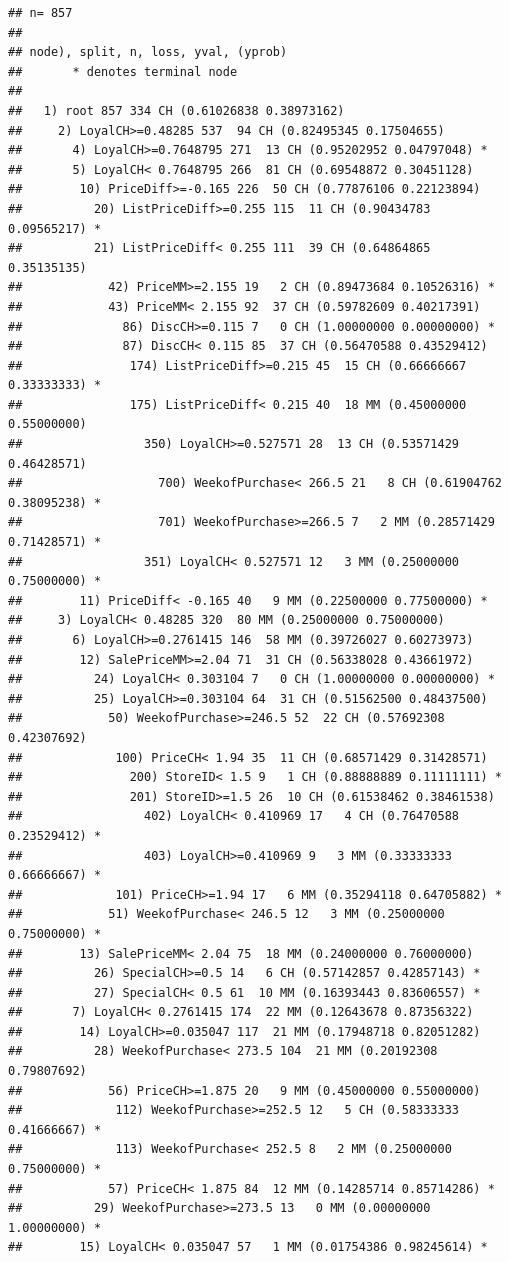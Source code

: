 \documentclass[
]{book}
\begin{document}
\begin{verbatim}
## n= 857 
## 
## node), split, n, loss, yval, (yprob)
##       * denotes terminal node
## 
##   1) root 857 334 CH (0.61026838 0.38973162)  
##     2) LoyalCH>=0.48285 537  94 CH (0.82495345 0.17504655)  
##       4) LoyalCH>=0.7648795 271  13 CH (0.95202952 0.04797048) *
##       5) LoyalCH< 0.7648795 266  81 CH (0.69548872 0.30451128)  
##        10) PriceDiff>=-0.165 226  50 CH (0.77876106 0.22123894)  
##          20) ListPriceDiff>=0.255 115  11 CH (0.90434783 0.09565217) *
##          21) ListPriceDiff< 0.255 111  39 CH (0.64864865 0.35135135)  
##            42) PriceMM>=2.155 19   2 CH (0.89473684 0.10526316) *
##            43) PriceMM< 2.155 92  37 CH (0.59782609 0.40217391)  
##              86) DiscCH>=0.115 7   0 CH (1.00000000 0.00000000) *
##              87) DiscCH< 0.115 85  37 CH (0.56470588 0.43529412)  
##               174) ListPriceDiff>=0.215 45  15 CH (0.66666667 0.33333333) *
##               175) ListPriceDiff< 0.215 40  18 MM (0.45000000 0.55000000)  
##                 350) LoyalCH>=0.527571 28  13 CH (0.53571429 0.46428571)  
##                   700) WeekofPurchase< 266.5 21   8 CH (0.61904762 0.38095238) *
##                   701) WeekofPurchase>=266.5 7   2 MM (0.28571429 0.71428571) *
##                 351) LoyalCH< 0.527571 12   3 MM (0.25000000 0.75000000) *
##        11) PriceDiff< -0.165 40   9 MM (0.22500000 0.77500000) *
##     3) LoyalCH< 0.48285 320  80 MM (0.25000000 0.75000000)  
##       6) LoyalCH>=0.2761415 146  58 MM (0.39726027 0.60273973)  
##        12) SalePriceMM>=2.04 71  31 CH (0.56338028 0.43661972)  
##          24) LoyalCH< 0.303104 7   0 CH (1.00000000 0.00000000) *
##          25) LoyalCH>=0.303104 64  31 CH (0.51562500 0.48437500)  
##            50) WeekofPurchase>=246.5 52  22 CH (0.57692308 0.42307692)  
##             100) PriceCH< 1.94 35  11 CH (0.68571429 0.31428571)  
##               200) StoreID< 1.5 9   1 CH (0.88888889 0.11111111) *
##               201) StoreID>=1.5 26  10 CH (0.61538462 0.38461538)  
##                 402) LoyalCH< 0.410969 17   4 CH (0.76470588 0.23529412) *
##                 403) LoyalCH>=0.410969 9   3 MM (0.33333333 0.66666667) *
##             101) PriceCH>=1.94 17   6 MM (0.35294118 0.64705882) *
##            51) WeekofPurchase< 246.5 12   3 MM (0.25000000 0.75000000) *
##        13) SalePriceMM< 2.04 75  18 MM (0.24000000 0.76000000)  
##          26) SpecialCH>=0.5 14   6 CH (0.57142857 0.42857143) *
##          27) SpecialCH< 0.5 61  10 MM (0.16393443 0.83606557) *
##       7) LoyalCH< 0.2761415 174  22 MM (0.12643678 0.87356322)  
##        14) LoyalCH>=0.035047 117  21 MM (0.17948718 0.82051282)  
##          28) WeekofPurchase< 273.5 104  21 MM (0.20192308 0.79807692)  
##            56) PriceCH>=1.875 20   9 MM (0.45000000 0.55000000)  
##             112) WeekofPurchase>=252.5 12   5 CH (0.58333333 0.41666667) *
##             113) WeekofPurchase< 252.5 8   2 MM (0.25000000 0.75000000) *
##            57) PriceCH< 1.875 84  12 MM (0.14285714 0.85714286) *
##          29) WeekofPurchase>=273.5 13   0 MM (0.00000000 1.00000000) *
##        15) LoyalCH< 0.035047 57   1 MM (0.01754386 0.98245614) *
\end{verbatim}
\end{document}
